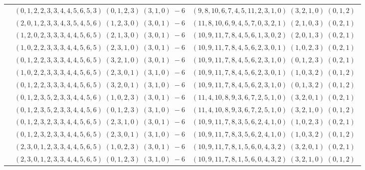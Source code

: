 \documentclass[11pt]{article}
\begin{document}
\begin{longtable}[l]{|c|c|c|}
 \cline{2-3} 
 & $(0 ,1 ,2 ,2 ,3 ,3 ,4 ,4 ,5 ,6 ,5 ,3) \;(0 ,1 ,2 ,3) \;(3 ,1 ,0) \;-6$ & $(9 ,8 ,10 ,6 ,7 ,4 ,5 ,11 ,2 ,3 ,1 ,0) \;(3 ,2 ,1 ,0) \;(0 ,1 ,2) \;$\\ 
 \cline{2-3} 
 & $(2 ,0 ,1 ,2 ,3 ,3 ,4 ,3 ,5 ,4 ,5 ,6) \;(1 ,2 ,3 ,0) \;(3 ,0 ,1) \;-6$ & $(11 ,8 ,10 ,6 ,9 ,4 ,5 ,7 ,0 ,3 ,2 ,1) \;(2 ,1 ,0 ,3) \;(0 ,2 ,1) \;$\\ 
 \cline{2-3} 
 & $(1 ,2 ,0 ,2 ,3 ,3 ,3 ,4 ,4 ,5 ,6 ,5) \;(2 ,1 ,3 ,0) \;(3 ,0 ,1) \;-6$ & $(10 ,9 ,11 ,7 ,8 ,4 ,5 ,6 ,1 ,3 ,0 ,2) \;(2 ,0 ,1 ,3) \;(0 ,2 ,1) \;$\\ 
 \cline{2-3} 
 & $(1 ,0 ,2 ,2 ,3 ,3 ,3 ,4 ,4 ,5 ,6 ,5) \;(2 ,3 ,1 ,0) \;(3 ,0 ,1) \;-6$ & $(10 ,9 ,11 ,7 ,8 ,4 ,5 ,6 ,2 ,3 ,0 ,1) \;(1 ,0 ,2 ,3) \;(0 ,2 ,1) \;$\\ 
 \cline{2-3} 
 & $(0 ,1 ,2 ,2 ,3 ,3 ,3 ,4 ,4 ,5 ,6 ,5) \;(3 ,2 ,1 ,0) \;(3 ,0 ,1) \;-6$ & $(10 ,9 ,11 ,7 ,8 ,4 ,5 ,6 ,2 ,3 ,1 ,0) \;(0 ,1 ,2 ,3) \;(0 ,2 ,1) \;$\\ 
 \cline{2-3} 
 & $(1 ,0 ,2 ,2 ,3 ,3 ,3 ,4 ,4 ,5 ,6 ,5) \;(2 ,3 ,0 ,1) \;(3 ,1 ,0) \;-6$ & $(10 ,9 ,11 ,7 ,8 ,4 ,5 ,6 ,2 ,3 ,0 ,1) \;(1 ,0 ,3 ,2) \;(0 ,1 ,2) \;$\\ 
 \cline{2-3} 
 & $(0 ,1 ,2 ,2 ,3 ,3 ,3 ,4 ,4 ,5 ,6 ,5) \;(3 ,2 ,0 ,1) \;(3 ,1 ,0) \;-6$ & $(10 ,9 ,11 ,7 ,8 ,4 ,5 ,6 ,2 ,3 ,1 ,0) \;(0 ,1 ,3 ,2) \;(0 ,1 ,2) \;$\\ 
 \cline{2-3} 
 & $(0 ,1 ,2 ,3 ,5 ,2 ,3 ,3 ,4 ,4 ,5 ,6) \;(1 ,0 ,2 ,3) \;(3 ,0 ,1) \;-6$ & $(11 ,4 ,10 ,8 ,9 ,3 ,6 ,7 ,2 ,5 ,1 ,0) \;(3 ,2 ,0 ,1) \;(0 ,2 ,1) \;$\\ 
 \cline{2-3} 
 & $(0 ,1 ,2 ,3 ,5 ,2 ,3 ,3 ,4 ,4 ,5 ,6) \;(0 ,1 ,2 ,3) \;(3 ,1 ,0) \;-6$ & $(11 ,4 ,10 ,8 ,9 ,3 ,6 ,7 ,2 ,5 ,1 ,0) \;(3 ,2 ,1 ,0) \;(0 ,1 ,2) \;$\\ 
 \cline{2-3} 
 & $(0 ,1 ,2 ,3 ,2 ,3 ,3 ,4 ,4 ,5 ,6 ,5) \;(2 ,3 ,1 ,0) \;(3 ,0 ,1) \;-6$ & $(10 ,9 ,11 ,7 ,8 ,3 ,5 ,6 ,2 ,4 ,1 ,0) \;(1 ,0 ,2 ,3) \;(0 ,2 ,1) \;$\\ 
 \cline{2-3} 
 & $(0 ,1 ,2 ,3 ,2 ,3 ,3 ,4 ,4 ,5 ,6 ,5) \;(2 ,3 ,0 ,1) \;(3 ,1 ,0) \;-6$ & $(10 ,9 ,11 ,7 ,8 ,3 ,5 ,6 ,2 ,4 ,1 ,0) \;(1 ,0 ,3 ,2) \;(0 ,1 ,2) \;$\\ 
 \cline{2-3} 
 & $(2 ,3 ,0 ,1 ,2 ,3 ,3 ,4 ,4 ,5 ,6 ,5) \;(1 ,0 ,2 ,3) \;(3 ,0 ,1) \;-6$ & $(10 ,9 ,11 ,7 ,8 ,1 ,5 ,6 ,0 ,4 ,3 ,2) \;(3 ,2 ,0 ,1) \;(0 ,2 ,1) \;$\\ 
 \cline{2-3} 
 & $(2 ,3 ,0 ,1 ,2 ,3 ,3 ,4 ,4 ,5 ,6 ,5) \;(0 ,1 ,2 ,3) \;(3 ,1 ,0) \;-6$ & $(10 ,9 ,11 ,7 ,8 ,1 ,5 ,6 ,0 ,4 ,3 ,2) \;(3 ,2 ,1 ,0) \;(0 ,1 ,2) \;$\\ 

\end{longtable}
\end{document}
